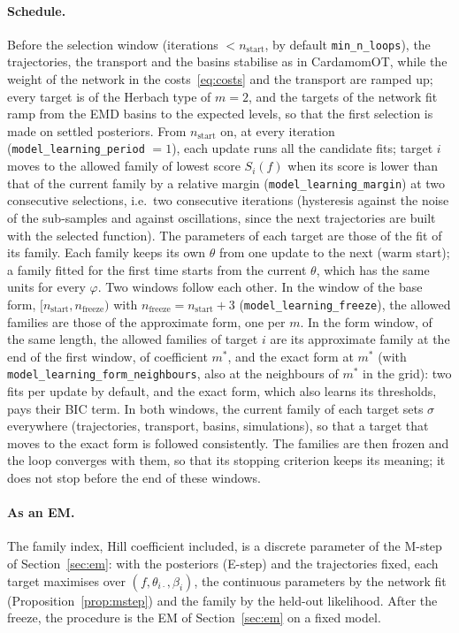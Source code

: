 \documentclass[a4paper, 11pt]{article}
\theoremstyle{plain}
\theoremstyle{remark}
\begin{document}
\paragraph{Schedule.} Before the selection window (iterations $< n_{\mathrm{start}}$, by default \texttt{min\_n\_loops}), the trajectories, the transport and the basins stabilise as in CardamomOT, while the weight of the network in the costs~\eqref{eq:costs} and the transport are ramped up; every target is of the Herbach type of $m = 2$, and the targets of the network fit ramp from the EMD basins to the expected levels, so that the first selection is made on settled posteriors. From $n_{\mathrm{start}}$ on, at every iteration (\texttt{model\_learning\_period} $= 1$), each update runs all the candidate fits; target $i$ moves to the allowed family of lowest score $S_i(f)$ when its score is lower than that of the current family by a relative margin (\texttt{model\_learning\_margin}) at two consecutive selections, i.e.\ two consecutive iterations (hysteresis against the noise of the sub-samples and against oscillations, since the next trajectories are built with the selected function). The parameters of each target are those of the fit of its family. Each family keeps its own $\theta$ from one update to the next (warm start); a family fitted for the first time starts from the current $\theta$, which has the same units for every $\varphi$. Two windows follow each other. In the window of the base form, $[n_{\mathrm{start}}, n_{\mathrm{freeze}})$ with $n_{\mathrm{freeze}} = n_{\mathrm{start}} + 3$ (\texttt{model\_learning\_freeze}), the allowed families are those of the approximate form, one per $m$. In the form window, of the same length, the allowed families of target $i$ are its approximate family at the end of the first window, of coefficient $m^*$, and the exact form at $m^*$ (with \texttt{model\_learning\_form\_neighbours}, also at the neighbours of $m^*$ in the grid): two fits per update by default, and the exact form, which also learns its thresholds, pays their BIC term. In both windows, the current family of each target sets $\sigma$ everywhere (trajectories, transport, basins, simulations), so that a target that moves to the exact form is followed consistently. The families are then frozen and the loop converges with them, so that its stopping criterion keeps its meaning; it does not stop before the end of these windows.


\paragraph{As an EM.} The family index, Hill coefficient included, is a discrete parameter of the M-step of Section~\ref{sec:em}: with the posteriors (E-step) and the trajectories fixed, each target maximises over $(f, \theta_{i\cdot}, \beta_i)$, the continuous parameters by the network fit (Proposition~\ref{prop:mstep}) and the family by the held-out likelihood. After the freeze, the procedure is the EM of Section~\ref{sec:em} on a fixed model.
\end{document}
